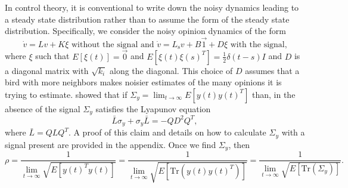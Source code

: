 \documentclass{article}
\newcommand{\Tr}{\text{Tr}}
\begin{document}
In control theory, it is conventional to write down the noisy dynamics leading to a steady state distribution rather than to assume the form of the steady state distribution.  Specifically, we consider the noisy opinion dynamics of the form 
\begin{equation*}
\dot{v}=Lv+K\xi \text{ without the signal and } \dot{v}=L_\text{s}v+B\vec{1}+D\xi \text{ with the signal,}
\end{equation*}
where $\xi$ such that $E[\xi(t)]=\vec{0}$ and $E[\xi(t)\xi(s)^T]=\frac{1}{2}\delta(t-s)I$ and $D$ is a diagonal matrix with $\sqrt{k_i}$ along the diagonal. This choice of $D$ assumes that a bird with more neighbors makes noisier estimates of the many opinions it is trying to estimate. \citet{Young:2010fk} showed that if $\Sigma_y=\lim_{t\to\infty}E[y(t)y(t)^T]$ than, in the absence of the signal $\Sigma_y$ satisfies the Lyapunov equation 
\begin{equation*}
\bar{L}\sigma_y+\sigma_y\bar{L}=-QD^2Q^T,
\end{equation*}
where $\bar{L}=QLQ^T$. A proof of this claim and details on how to calculate $\Sigma_y$ with a signal present are provided in the appendix. Once we find $\Sigma_y$, then 
\begin{equation*}
\rho=\frac{1}{\lim_{t\to\infty}\sqrt{E[y(t)^Ty(t)]}}=
\frac{1}{\lim_{t\to\infty}\sqrt{E[\Tr(y(t)y(t)^T)]}}=
\frac{1}{\lim_{t\to\infty}\sqrt{E[\Tr(\Sigma_y)]}}.
\end{equation*}
\end{document}
